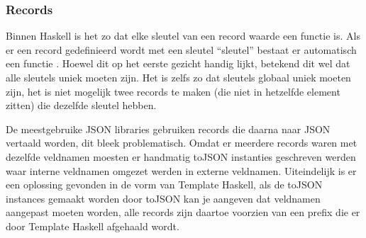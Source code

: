 \subsubsection{Records}
Binnen Haskell is het zo dat elke sleutel van een record waarde een functie is. Als er een record gedefinieerd wordt met een sleutel ``sleutel'' bestaat er automatisch een functie . Hoewel dit op het eerste gezicht handig lijkt, betekend dit wel dat alle sleutels uniek moeten zijn. Het is zelfs zo dat sleutels globaal uniek moeten zijn, het is niet mogelijk twee records te maken (die niet in hetzelfde  element zitten) die dezelfde sleutel hebben.

De meestgebruike JSON libraries gebruiken records die daarna naar JSON vertaald worden, dit bleek problematisch. Omdat er meerdere records waren met dezelfde veldnamen moesten er handmatig toJSON instanties geschreven werden waar interne veldnamen omgezet werden in externe veldnamen. Uiteindelijk is er een oplossing gevonden in de vorm van Template Haskell, als de toJSON instances gemaakt worden door toJSON kan je aangeven dat veldnamen aangepast moeten worden, alle records zijn daartoe voorzien van een prefix die er door Template Haskell afgehaald wordt.


